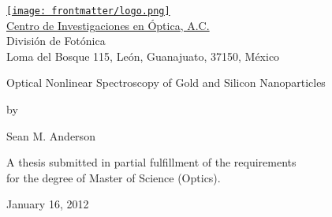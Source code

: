 \begin{titlepage}
\begin{center}
   {\href{http://www.cio.mx}{\texttt{[image: frontmatter/logo.png]}}
   {\\
{{\href{http://www.cio.mx}{{{\Large Centro de Investigaciones en \'Optica}}, A.C.}}}\\   
    \vspace{.1cm}
 {\Large{Divisi\'on de Fot\'onica\\
\vspace{.1cm}
{{\small Loma del Bosque 115, Le\'on, Guanajuato, 37150, M\'exico}}
   }}}}
\vspace{2cm}

{\ttfamily
{\Huge{Optical Nonlinear Spectroscopy of Gold and Silicon Nanoparticles}}
\vspace{0.5cm}

{\large{by}}
\vspace{0.5cm}

{\LARGE{Sean M. Anderson}}
\vspace{0.5cm}
}

{\large A thesis submitted in partial fulfillment of the
                requirements \\for the degree of Master of Science (Optics).}

\vspace{2cm}

{\large{}}
\vfill
January 16, 2012
\end{center}
\end{titlepage}

